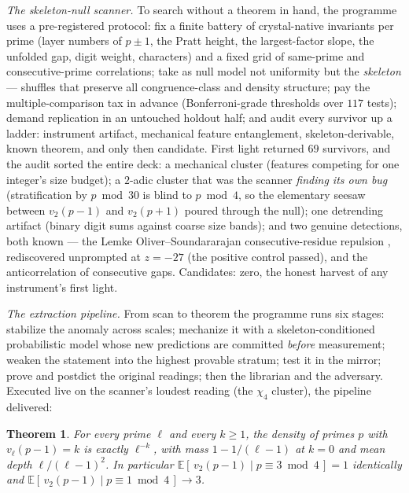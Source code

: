 \documentclass[11pt]{article}
\newtheorem{theorem}{Theorem}
\theoremstyle{remark}
\begin{document}
\emph{The skeleton-null scanner.} To search without a theorem in hand, the programme uses a
pre-registered protocol: fix a finite battery of crystal-native invariants per prime (layer numbers
of $p \pm 1$, the Pratt height, the largest-factor slope, the unfolded gap, digit weight, characters)
and a fixed grid of same-prime and consecutive-prime correlations; take as null model not uniformity
but the \emph{skeleton} --- shuffles that preserve all congruence-class and density structure; pay
the multiple-comparison tax in advance (Bonferroni-grade thresholds over $117$ tests); demand
replication in an untouched holdout half; and audit every survivor up a ladder: instrument artifact,
mechanical feature entanglement, skeleton-derivable, known theorem, and only then candidate. First
light returned $69$ survivors, and the audit sorted the entire deck: a mechanical cluster (features
competing for one integer's size budget); a $2$-adic cluster that was the scanner \emph{finding its
own bug} (stratification by $p \bmod 30$ is blind to $p \bmod 4$, so the elementary seesaw between
$v_2(p-1)$ and $v_2(p+1)$ poured through the null); one detrending artifact (binary digit sums
against coarse size bands); and two genuine detections, both known --- the
Lemke Oliver--Soundararajan consecutive-residue repulsion \cite{LOS}, rediscovered unprompted at
$z = -27$ (the positive control passed), and the anticorrelation of consecutive gaps. Candidates:
zero, the honest harvest of any instrument's first light.

\emph{The extraction pipeline.} From scan to theorem the programme runs six stages: stabilize the
anomaly across scales; mechanize it with a skeleton-conditioned probabilistic model whose new
predictions are committed \emph{before} measurement; weaken the statement into the highest provable
stratum; test it in the mirror; prove and postdict the original readings; then the librarian and the
adversary. Executed live on the scanner's loudest reading (the $\chi_4$ cluster), the pipeline
delivered:

\begin{theorem}
For every prime $\ell$ and every $k \ge 1$, the density of primes $p$ with
$v_\ell(p-1) = k$ is exactly $\ell^{-k}$, with mass $1 - 1/(\ell - 1)$ at $k = 0$ and mean depth
$\ell/(\ell-1)^2$. In particular $\mathbb{E}[\,v_2(p-1) \mid p \equiv 3 \bmod 4\,] = 1$ identically
and $\mathbb{E}[\,v_2(p-1) \mid p \equiv 1 \bmod 4\,] \to 3$.
\end{theorem}
\end{document}
